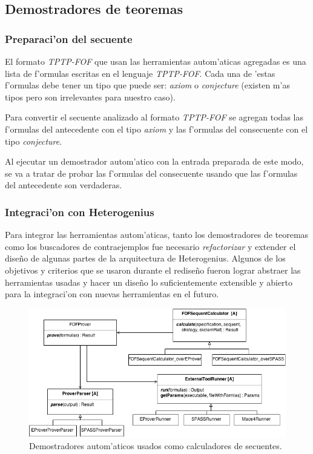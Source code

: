 \subsection{Demostradores de teoremas}

\subsubsection{Preparaci'on del secuente}

El formato \textit{TPTP-FOF} que usan las herramientas autom'aticas agregadas es una lista de f'ormulas escritas en el lenguaje \textit{TPTP-FOF}. Cada una de 'estas f'ormulas debe tener un tipo que puede ser: \textit{axiom} o \textit{conjecture} (existen m'as tipos pero son irrelevantes para nuestro caso).

Para convertir el secuente analizado al formato \textit{TPTP-FOF} se agregan todas las f'ormulas del antecedente con el tipo \textit{axiom} y las f'ormulas del consecuente con el tipo \textit{conjecture}. 

Al ejecutar un demostrador autom'atico con la entrada preparada de este modo, se va a tratar de probar las f'ormulas del consecuente usando que las f'ormulas del antecedente son verdaderas.


\subsubsection{Integraci'on con Heterogenius}

Para integrar las herramientas autom'aticas, tanto los demostradores de teoremas como los buscadores de contraejemplos fue necesario \textit{refactorizar} y extender el diseño de algunas partes de la arquitectura de Heterogenius. Algunos de los objetivos y criterios que se usaron durante el rediseño fueron lograr abstraer las herramientas usadas y hacer un diseño lo suficientemente extensible y abierto para la integraci'on con nuevas herramientas en el futuro.

\begin{figure}[H]
	\includegraphics[width=450px]{img/arq_prover.png}
	\centering
	\caption{Demostradores autom'aticos usados como calculadores de secuentes.}
\end{figure}

